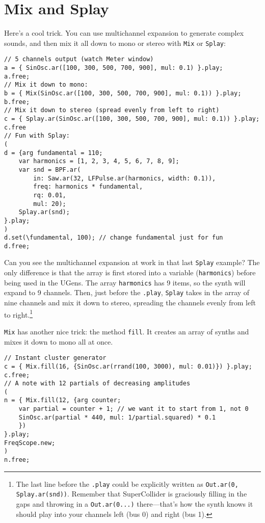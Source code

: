 \section{Mix and Splay}

Here's a cool trick. You can use multichannel expansion to generate complex sounds, and then mix it all down to mono or stereo with \texttt{Mix} or \texttt{Splay}:
 
\begin{lstlisting}[style=SuperCollider-IDE, basicstyle=\scttfamily\footnotesize]
// 5 channels output (watch Meter window)
a = { SinOsc.ar([100, 300, 500, 700, 900], mul: 0.1) }.play;
a.free;
// Mix it down to mono:
b = { Mix(SinOsc.ar([100, 300, 500, 700, 900], mul: 0.1)) }.play;
b.free;
// Mix it down to stereo (spread evenly from left to right)
c = { Splay.ar(SinOsc.ar([100, 300, 500, 700, 900], mul: 0.1)) }.play;
c.free
// Fun with Splay:
(
d = {arg fundamental = 110;
	var harmonics = [1, 2, 3, 4, 5, 6, 7, 8, 9];
	var snd = BPF.ar(
		in: Saw.ar(32, LFPulse.ar(harmonics, width: 0.1)),
		freq: harmonics * fundamental,
		rq: 0.01,
		mul: 20);
	Splay.ar(snd);	
}.play;
)
d.set(\fundamental, 100); // change fundamental just for fun
d.free;
\end{lstlisting}
 
Can you see the multichannel expansion at work in that last \texttt{Splay} example? The only difference is that the array is first stored into a variable (\texttt{harmonics}) before being used in the UGens. The array \texttt{harmonics} has 9 items, so the synth will expand to 9 channels. Then, just before the \texttt{.play}, \texttt{Splay} takes in the array of nine channels and mix it down to stereo, spreading the channels evenly from left to right.\footnote{The last line before the \texttt{.play} could be explicitly written as \texttt{Out.ar(0, Splay.ar(snd))}. Remember that SuperCollider is graciously filling in the gaps and throwing in a \texttt{Out.ar(0...)} there---that's how the synth knows it should play into your channels left (bus 0) and right (bus 1).}

\texttt{Mix} has another nice trick: the method \texttt{fill}. It creates an array of synths and mixes it down to mono all at once.

\begin{lstlisting}[style=SuperCollider-IDE, basicstyle=\scttfamily\footnotesize]
// Instant cluster generator
c = { Mix.fill(16, {SinOsc.ar(rrand(100, 3000), mul: 0.01)}) }.play;
c.free;
// A note with 12 partials of decreasing amplitudes
(
n = { Mix.fill(12, {arg counter;
	var partial = counter + 1; // we want it to start from 1, not 0
	SinOsc.ar(partial * 440, mul: 1/partial.squared) * 0.1
	})
}.play;
FreqScope.new;
)
n.free;
\end{lstlisting}

